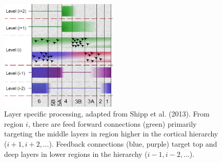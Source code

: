 \begin{figure}[!ht]
	\centering
	\includegraphics[width=0.5\textwidth, clip=true]{./Chapters/01_Introduction/Images/LaminarProcessing}
	\caption{Layer specific processing, adapted from Shipp et al. (2013)\cite{Shipp2013}. From region $i$, there are feed forward connections (green) primarily targeting the middle layers in region higher in the cortical hierarchy ($i+1, i+2, \ldots$). Feedback connections (blue, purple) target top and deep layers in lower regions in the hierarchy ($i-1, i-2, \ldots$).}
	\label{fig:layerprocessing}
\end{figure}